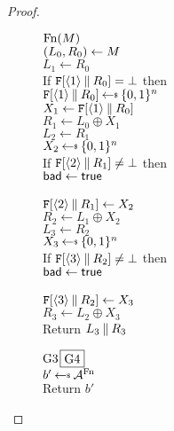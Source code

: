 \begin{proof}
\begin{figure}[t]
{\underline{$\textnormal{Fn}(M)$}\\
$(L_0, R_0) \gets M$\\
$L_1 \gets R_0$\\
If $\mathtt{F}[\langle1\rangle\: \| \: R_0] = \bot$ then\\
\ind $\TabF[\langle1\rangle\concat R_0] \getsr \bits^n$\\
$X_1 \gets \mathtt{F}[\langle1\rangle\: \| \: R_0]$\\
$R_1 \gets L_0 \oplus X_1$\\
$L_2 \gets R_1$\\
$X_2 \getsr \bits^n$\\
If $\mathtt{F}[\langle2\rangle\: \| \: R_1] \ne \bot$ then\\
\ind $\mathsf{bad}\gets\mathsf{true}$\\
\ind {}\\
$\mathtt{F}[\langle2\rangle\: \| \: R_1] \gets X_2$\\
$R_2 \gets L_1 \oplus X_2$\\
$L_3 \gets R_2$\\
$X_3 \getsr \bits^n$\\
If $\mathtt{F}[\langle3\rangle\: \| \: R_2] \ne \bot$ then\\
\ind $\mathsf{bad}\gets\mathsf{true}$\\
\ind {}\\
$\mathtt{F}[\langle3\rangle\: \| \: R_2] \gets X_3$\\
$R_3 \gets L_2 \oplus X_3$\\
Return $L_3 \: \| \: R_3$
}{
\underline{${{\textnormal G}}3$\;\;\;$\fbox{{{\textnormal G}}4}$}\\[2pt]
$b' \getsr \advA^\Fn$\\
Return $b'$\medskip

}
\end{figure}
\end{proof}
